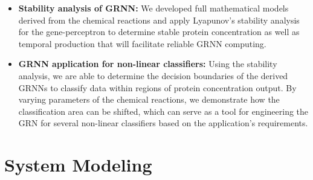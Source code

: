 \documentclass[twocolumn]{biophys-new}
\begin{document}
{{\begin{itemize}
    \item \textbf{Stability analysis of GRNN:} 
    We developed full mathematical models derived from the chemical reactions and apply Lyapunov's stability analysis for the gene-perceptron to determine stable protein concentration as well as temporal production that will facilitate reliable GRNN computing. %
    

    \item \textbf{GRNN application for non-linear classifiers:}
    Using the stability analysis, we are able to determine the decision boundaries of the derived GRNNs to classify data within regions of protein concentration output. 
    By varying parameters of the chemical reactions, we demonstrate how the classification area can be shifted,  which can serve as a tool for engineering the GRN for several non-linear classifiers based on the application's requirements.
    
\end{itemize}

\section*{System Modeling} \label{Background}


}}
\end{document}
